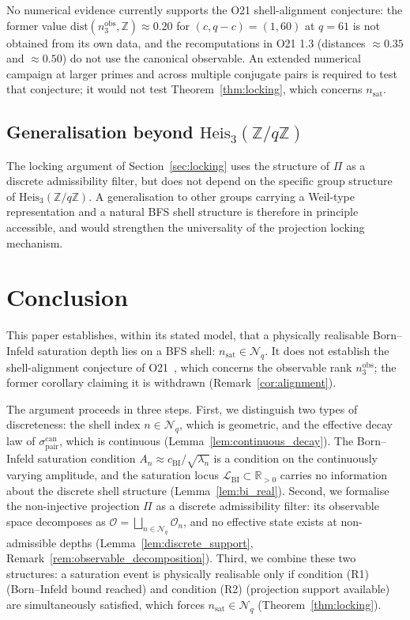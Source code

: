 \documentclass[12pt,a4paper]{article}
\theoremstyle{remark}
\newcommand{\cchi}{c_{\mathrm{BI}}}
\newcommand{\sigpair}{\sigma^{\mathrm{can}}_{\mathrm{pair}}}
\newcommand{\nsat}{n_{\mathrm{sat}}}
\newcommand{\nobs}{n^{\mathrm{obs}}_3}
\newcommand{\Heis}{\mathrm{Heis}_3(\mathbb{Z}/q\mathbb{Z})}
\begin{document}
    No numerical evidence currently supports the O21 shell-alignment conjecture: the former value
    $\mathrm{dist}(\nobs, \mathbb{Z}) \approx 0.20$ for $(c, q-c) = (1, 60)$ at $q = 61$ is not obtained
    from its own data, and the recomputations in O21 1.3 (distances $\approx 0.35$ and $\approx 0.50$) do
    not use the canonical observable.
    An extended numerical campaign at larger primes and across multiple conjugate pairs is required
    to test that conjecture; it would not test Theorem~\ref{thm:locking}, which concerns $\nsat$.

  \subsection{Generalisation beyond $\Heis$}
    \label{subsec:generalisation}

    The locking argument of Section~\ref{sec:locking} uses the structure of $\Pi$ as a discrete
    admissibility filter, but does not depend on the specific group structure of $\Heis$.
    A generalisation to other groups carrying a Weil-type representation and a natural BFS
    shell structure is therefore in principle accessible, and would strengthen the universality
    of the projection locking mechanism.

  \section{Conclusion}
  \label{sec:conclusion}

  This paper establishes, within its stated model, that a physically realisable
  Born--Infeld saturation depth lies on a BFS shell: $\nsat \in \mathcal{N}_q$.
  It does not establish the shell-alignment conjecture of O21~\cite{Beau2026a25},
  which concerns the observable rank $\nobs$; the former corollary claiming it is
  withdrawn (Remark~\ref{cor:alignment}).

  The argument proceeds in three steps.
  First, we distinguish two types of discreteness: the shell index $n \in \mathcal{N}_q$,
  which is geometric, and the effective decay law of $\sigpair$, which is continuous
  (Lemma~\ref{lem:continuous_decay}).
  The Born--Infeld saturation condition $A_n \approx \cchi/\sqrt{\lambda_n}$ is a
  condition on the continuously varying amplitude, and the saturation locus
  $\mathcal{L}_{\mathrm{BI}} \subset \mathbb{R}_{>0}$ carries no information about
  the discrete shell structure (Lemma~\ref{lem:bi_real}).
  Second, we formalise the non-injective projection $\Pi$ as a discrete admissibility
  filter: its observable space decomposes as $\mathcal{O} = \bigsqcup_{n \in \mathcal{N}_q}
  \mathcal{O}_n$, and no effective state exists at non-admissible depths
  (Lemma~\ref{lem:discrete_support}, Remark~\ref{rem:observable_decomposition}).
  Third, we combine these two structures: a saturation event is physically realisable
  only if condition (R1) (Born--Infeld bound reached) and condition (R2) (projection
  support available) are simultaneously satisfied, which forces $\nsat \in \mathcal{N}_q$
  (Theorem~\ref{thm:locking}).
\end{document}
